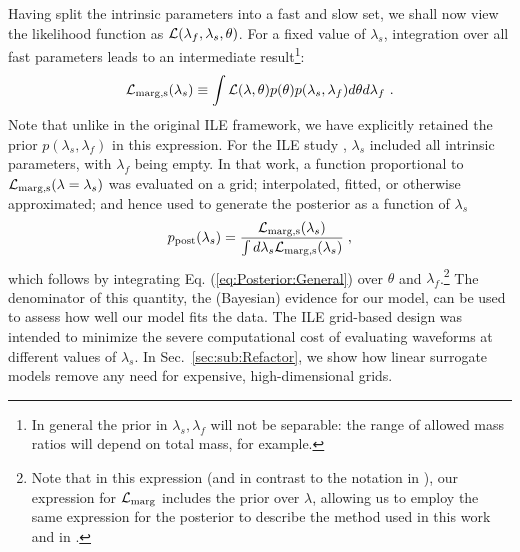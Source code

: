 \documentclass[aps,prd,nofootinbib,showpacs,amssymb,twocolumn]{revtex4}
\newcommand\ILE{ILE}
\begin{document}
Having split the intrinsic parameters into a fast and slow set, 
we shall now view the likelihood function as ${\cal L}(\lambda_f, \lambda_s, \theta)$. For a fixed
value of $\lambda_s$, integration over
%
all fast parameters %
%
leads to an intermediate result\footnote{In general the prior in $\lambda_s,\lambda_f$ will not be separable: the range of allowed mass ratios will depend on total mass, for example.}:
\begin{eqnarray}
\label{eq:Marginalize:GeneralIdea}
{\cal L}_{\rm marg,s}(\lambda_s) \equiv \int {\cal L}(\lambda,\theta)p(\theta) p(\lambda_s,\lambda_f) d\theta d\lambda_f\ .
\end{eqnarray}
Note that unlike in the original ILE framework, we have explicitly retained the prior $p(\lambda_s,\lambda_f)$ 
%
in this expression.
For the \ILE{} study \cite{gwastro-PE-AlternativeArchitectures},  $\lambda_s$  included all intrinsic parameters, with
$\lambda_f$ being empty.  
 In that work, a function proportional to ${\cal L}_{\rm marg,s}(\lambda = \lambda_s)$ was evaluated on a grid;
interpolated, fitted, or otherwise approximated; and hence used to 
generate the posterior  as a function of $\lambda_s$
\begin{eqnarray}
p_{\rm post}(\lambda_s) =  \frac{{\cal L}_{\rm marg,s }(\lambda_s)  }{ \int d\lambda_s  {\cal
  L}_{\rm marg,s}(\lambda_s )} \; ,
\end{eqnarray}
which follows by integrating Eq. (\ref{eq:Posterior:General}) over $\theta$ and $\lambda_f$.\footnote{Note that in this expression (and
in contrast to the notation in \cite{gwastro-PE-AlternativeArchitectures}), our expression for ${\cal L}_{\rm marg}$
includes the prior over $\lambda$, allowing us to employ the same expression for the posterior to describe the method
used in this work and in \cite{gwastro-PE-AlternativeArchitectures}. }
%
%
The denominator of this quantity, the (Bayesian) evidence for our model, can be used to assess how well our model fits the data.
The ILE grid-based design was intended
%
to minimize the severe computational cost
%
of evaluating waveforms at different values of $\lambda_s$.
In Sec.~\ref{sec:sub:Refactor}, we show how linear surrogate models remove any need for expensive, high-dimensional grids.
%
%
%
\end{document}

